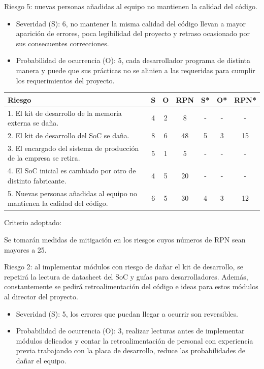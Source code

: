 \documentclass[
11pt, %
]{charter}
\begin{document}
Riesgo 5: nuevas personas añadidas al equipo no mantienen la calidad del código. 
\begin{itemize}
	\item Severidad (S): 6, no mantener la misma calidad del código llevan a mayor aparición de errores, poca legibilidad del proyecto y retraso ocasionado por sus consecuentes correcciones.
	\item Probabilidad de ocurrencia (O): 5, cada desarrollador programa de distinta manera y puede que sus prácticas no se alinien a las requeridas para cumplir los requerimientos del proyecto.  
\end{itemize}

\begin{table}[htpb]
\centering
\begin{tabularx}{\linewidth}{@{}|X|c|c|c|c|c|c|@{}}
\hline
\rowcolor[HTML]{C0C0C0} 
Riesgo & S & O & RPN & S* & O* & RPN* \\ \hline
1. El kit de desarrollo de la memoria externa se daña.       & 4 &  2 & 8    & -   &  -  & -     \\ \hline
2. El kit de desarrollo del SoC se daña. & 8 & 6 & 48 &  5  &  3  &  15    \\ \hline
3. El encargado del sistema de producción de la empresa se retira.& 5 & 1 & 5  & -   & -   & -     \\ \hline
4. El SoC inicial es cambiado por otro de distinto fabricante. & 4 & 5 & 20 & -   & -   & -     \\ \hline
5. Nuevas personas añadidas al equipo no mantienen la calidad del código. & 6 & 5 & 30 & 4 & 3 & 12     \\ \hline
\end{tabularx}%
\end{table}

Criterio adoptado:

Se tomarán medidas de mitigación en los riesgos cuyos números de RPN sean mayores a 25.

Riesgo 2: al implementar módulos con riesgo de dañar el kit de desarrollo, se repetirá la lectura de datasheet del SoC y guías para desarrolladores. Además, constantemente se pedirá retroalimentación del código e ideas para estos módulos al director del proyecto.
\begin{itemize}
	\item Severidad (S): 5, los errores que puedan llegar a ocurrir son reversibles.  
	\item Probabilidad de ocurrencia (O): 3, realizar lecturas antes de implementar módulos delicados y contar la retroalimentación de personal con experiencia previa trabajando con la placa de desarrollo, reduce las probabilidades de dañar el equipo.
\end{itemize}
\end{document}

